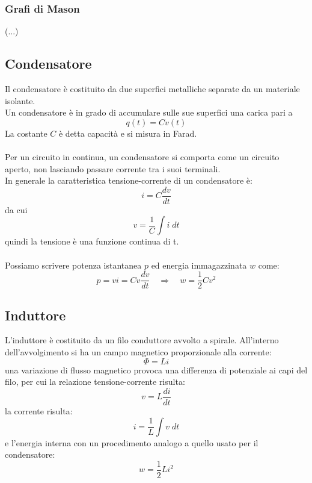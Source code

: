 \documentclass{article}
\begin{document}
\subsubsection{Grafi di Mason}
(...)


\subsection{Condensatore}
Il condensatore è costituito da due superfici metalliche separate da un materiale isolante.\\
Un condensatore è in grado di accumulare sulle sue superfici una carica pari a
$$ q(t)=Cv(t) $$
La costante $C$ è detta capacità e si misura in Farad.\\\\
Per un circuito in continua, un condensatore si comporta come un circuito aperto, non lasciando passare corrente tra i suoi terminali.\\
In generale la caratteristica tensione-corrente di un condensatore è:
$$ i=C\frac{dv}{dt} $$
da cui
$$ v=\frac{1}{C}\int i\;dt $$
quindi la tensione è una funzione continua di t.\\\\
Possiamo scrivere potenza istantanea $p$ ed energia immagazzinata $w$ come:
$$ p=vi=Cv\frac{dv}{dt} \quad\Rightarrow\quad w=\frac{1}{2}Cv^2 $$

\subsection{Induttore}
L'induttore è costituito da un filo conduttore avvolto a spirale. All'interno dell'avvolgimento si ha un campo magnetico proporzionale alla corrente:
$$ \Phi=Li $$
una variazione di flusso magnetico provoca una differenza di potenziale ai capi del filo, per cui la relazione tensione-corrente risulta:
$$ v=L\frac{di}{dt} $$
la corrente risulta:
$$ i=\frac{1}{L}\int v\;dt $$
e l'energia interna con un procedimento analogo a quello usato per il condensatore:
$$ w=\frac{1}{2}Li^2 $$






\newpage
\end{document}
